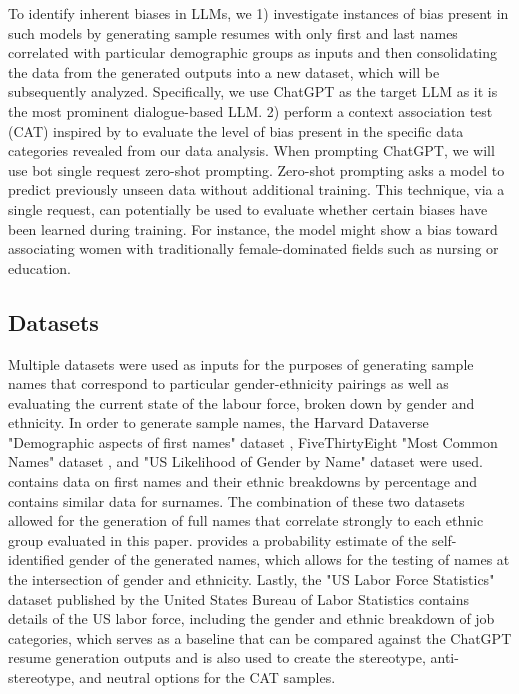 \documentclass{article}
\begin{document}
To identify inherent biases in LLMs, we 1) investigate instances of bias present in such models by generating sample resumes with only first and last names correlated with particular demographic groups as inputs and then consolidating the data from the generated outputs into a new dataset, which will be subsequently analyzed. Specifically, we use ChatGPT as the target LLM as it is the most prominent dialogue-based LLM. 2) perform a context association test (CAT) inspired by \cite{nadeem2020stereoset} to evaluate the level of bias present in the specific data categories revealed from our data analysis. When prompting ChatGPT, we will use bot single request zero-shot prompting. Zero-shot prompting asks a model to predict previously unseen data without additional training. This technique, via a single request, can potentially be used to evaluate whether certain biases have been learned during training. For instance, the model might show a bias toward associating women with traditionally female-dominated fields such as nursing or education. 


    \subsection{Datasets}
    Multiple datasets were used as inputs for the purposes of generating sample names that correspond to particular gender-ethnicity pairings as well as evaluating the current state of the labour force, broken down by gender and ethnicity. In order to generate sample names, the Harvard Dataverse "Demographic aspects of first names" dataset \cite{DVN/TYJKEZ_2018}, FiveThirtyEight "Most Common Names" dataset \cite{mostcommon}, and "US Likelihood of Gender by Name" \cite{organisciak} dataset were used. \cite{DVN/TYJKEZ_2018} contains data on first names and their ethnic breakdowns by percentage and \cite{mostcommon} contains similar data for surnames. The combination of these two datasets allowed for the generation of full names that correlate strongly to each ethnic group evaluated in this paper. \cite{organisciak} provides a probability estimate of the self-identified gender of the generated names, which allows for the testing of names at the intersection of gender and ethnicity. Lastly, the "US Labor Force Statistics" dataset \cite{USBL} published by the United States Bureau of Labor Statistics contains details of the US labor force, including the gender and ethnic breakdown of job categories, which serves as a baseline that can be compared against the ChatGPT resume generation outputs and is also used to create the stereotype, anti-stereotype, and neutral options for the CAT samples.
\end{document}
